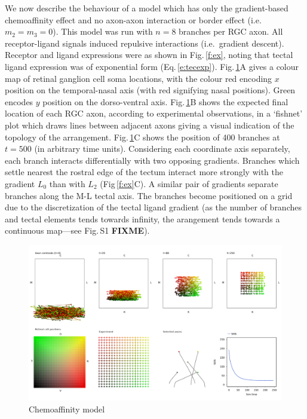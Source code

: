 \documentclass[11pt, a4paper]{article}
\begin{document}
We now describe the behaviour of a model which has only the gradient-based
chemoaffinity effect and no axon-axon interaction or border effect
(i.e.~$m_2=m_3=0$). This model was run with $n=8$ branches per RGC axon. All
receptor-ligand signals induced repulsive interactions (i.e.~gradient
descent). Receptor and ligand expressions were as shown in Fig.\,\ref{f:ex},
noting that tectal ligand expression was of exponential form
(Eq.\,\ref{e:tecexp}). Fig.\,\ref{f:ch}A gives a colour map of retinal
ganglion cell soma locations, with the colour red encoding $x$ position on the
temporal-nasal axis (with red signifying nasal positions). Green encodes $y$
position on the dorso-ventral axis.
%
Fig.\,\ref{f:ch}B shows the expected final location of each RGC axon,
according to experimental observations, in a `fishnet' plot which draws lines
between adjacent axons giving a visual indication of the topology of the
arrangement.
%
Fig.\,\ref{f:ch}C shows the position of
400 branches at $t=500$ (in arbitrary time units). Considering each
coordinate axis separately, each branch interacts differentially with two
opposing gradients. Branches which settle nearest the rostral edge of the
tectum interact more strongly with the gradient $L_0$ than with $L_2$
(Fig\,\ref{f:ex}C). A similar pair of gradients separate branches along the
M-L tectal axis. The branches become positioned on a grid due to the
discretization of the tectal ligand gradient (as the number of branches and
tectal elements tends towards infinity, the arangement tends towards a
continuous map---see Fig.\,S1 \textbf{FIXME}).

\begin{figure}
\includegraphics[width=\linewidth]{./images/j4_ee_chemoonly_wt_chemoonly.png}
\caption{Chemoaffinity model}
\label{f:ch}
\end{figure}
\end{document}
